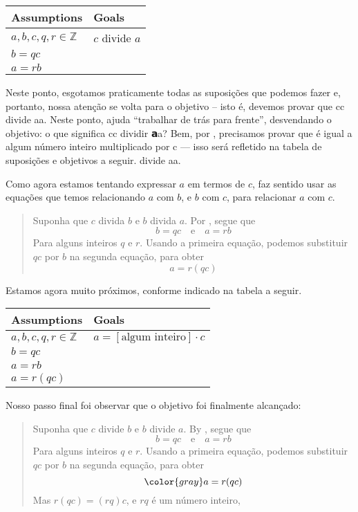 \begin{example}
\begin{center}
\begin{tabular}{C{150pt}|C{150pt}}
\textbf{Assumptions} & \textbf{Goals} \\ \hline
$a,b,c,q,r \in \mathbb{Z}$ & $c$ divide $a$ \\
$b=qc$ & \\
$a=rb$ &
\end{tabular}
\end{center}

Neste ponto, esgotamos praticamente todas as suposições que podemos fazer e, portanto, nossa atenção se volta para o objetivo – isto é, devemos provar que cc
  divide aa. Neste ponto, ajuda “trabalhar de trás para frente”, desvendando o objetivo: o que significa cc dividir  𝗮a? Bem, por , precisamos provar que  é igual a algum número inteiro multiplicado por  c --- isso será refletido na tabela de suposições e objetivos a seguir.
  divide aa. 

Como agora estamos tentando expressar $a$ em termos de $c$, faz sentido usar as equações que temos relacionando $a$ com $b$, e $b$ com $c$, para relacionar $a$ com $c$.

\begin{quote}
{\color{gray} Suponha que $c$ divida $b$ e $b$ divida $a$. Por , segue que
\[
b=qc \quad \text{e} \quad a=rb
\]
Para alguns inteiros $q$ e $r$.} Usando a primeira equação, podemos substituir $qc$ por $b$ na segunda equação, para obter
\[
a=r(qc)
\]
\end{quote}

Estamos agora muito próximos, conforme indicado na tabela a seguir.

\begin{center}
\begin{tabular}{C{150pt}|C{150pt}}
\textbf{Assumptions} & \textbf{Goals} \\ \hline
$a,b,c,q,r \in \mathbb{Z}$ & $a = [\text{algum inteiro}] \cdot c$ \\
$b=qc$ & \\
$a=rb$ & \\
$a=r(qc)$ & 
\end{tabular}
\end{center}

Nosso passo final foi observar que o objetivo foi finalmente alcançado:

\begin{quote}
{\color{gray} Suponha que $c$ divide $b$ e $b$ divide $a$. By , segue que
\[
b=qc \quad \text{e} \quad a=rb
\]
Para alguns inteiros $q$ e $r$. Usando a primeira equação, podemos substituir $qc$ por $b$ na segunda equação, para obter}
\[
{\color{gray} a=r(qc)}
\]
Mas $r(qc) = (rq)c$, e $rq$  é um número inteiro,
\end{quote}


\end{example}

